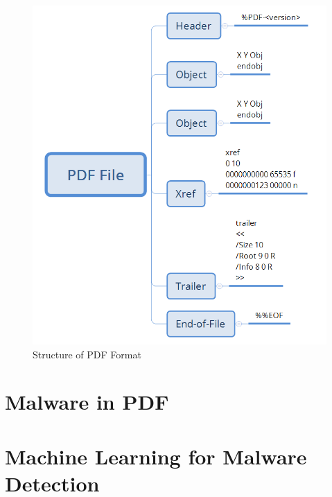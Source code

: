 \begin{figure}[H]
	\centerline{\includegraphics[scale=0.4]{figures/PDFSkeleton.png}}  
	\caption{Structure of PDF Format \cite{logrhythm}}
	\label{pdfSkeleton}
\end{figure}


\section{Malware in PDF}
\label{section:malwareInPDF}

\section{Machine Learning for Malware Detection}
\label{section:mlForMalware}


